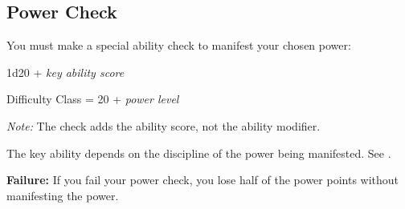 \subsection{Power Check}
You must make a special ability check to manifest your chosen power:

\begin{Formula}{1d20 + \textit{key ability score}}
	\item Difficulty Class = 20 + \textit{power level}
\end{Formula}

\textit{Note:} The check adds the ability score, not the ability modifier.

The key ability depends on the discipline of the power being manifested. See .


\textbf{Failure:} If you fail your power check, you lose half of the power points without manifesting the power.